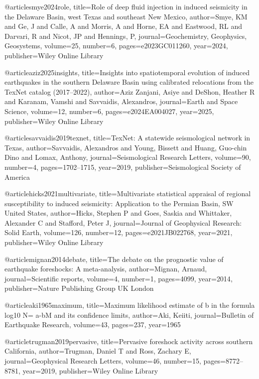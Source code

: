 @article{smye2024role,
  title={Role of deep fluid injection in induced seismicity in the Delaware Basin, west Texas and southeast New Mexico},
  author={Smye, KM and Ge, J and Calle, A and Morris, A and Horne, EA and Eastwood, RL and Darvari, R and Nicot, JP and Hennings, P},
  journal={Geochemistry, Geophysics, Geosystems},
  volume={25},
  number={6},
  pages={e2023GC011260},
  year={2024},
  publisher={Wiley Online Library}
}

@article{aziz2025insights,
  title={Insights into spatiotemporal evolution of induced earthquakes in the southern Delaware Basin using calibrated relocations from the TexNet catalog (2017--2022)},
  author={Aziz Zanjani, Asiye and DeShon, Heather R and Karanam, Vamshi and Savvaidis, Alexandros},
  journal={Earth and Space Science},
  volume={12},
  number={6},
  pages={e2024EA004027},
  year={2025},
  publisher={Wiley Online Library}
}

@article{savvaidis2019texnet,
  title={TexNet: A statewide seismological network in Texas},
  author={Savvaidis, Alexandros and Young, Bissett and Huang, Guo-chin Dino and Lomax, Anthony},
  journal={Seismological Research Letters},
  volume={90},
  number={4},
  pages={1702--1715},
  year={2019},
  publisher={Seismological Society of America}
}

@article{hicks2021multivariate,
  title={Multivariate statistical appraisal of regional susceptibility to induced seismicity: Application to the Permian Basin, SW United States},
  author={Hicks, Stephen P and Goes, Saskia and Whittaker, Alexander C and Stafford, Peter J},
  journal={Journal of Geophysical Research: Solid Earth},
  volume={126},
  number={12},
  pages={e2021JB022768},
  year={2021},
  publisher={Wiley Online Library}
}

@article{mignan2014debate,
  title={The debate on the prognostic value of earthquake foreshocks: A meta-analysis},
  author={Mignan, Arnaud},
  journal={Scientific reports},
  volume={4},
  number={1},
  pages={4099},
  year={2014},
  publisher={Nature Publishing Group UK London}
}

@article{aki1965maximum,
  title={Maximum likelihood estimate of b in the formula log10 N= a-bM and its confidence limits},
  author={Aki, Keiiti},
  journal={Bulletin of Earthquake Research},
  volume={43},
  pages={237},
  year={1965}
}

@article{trugman2019pervasive,
  title={Pervasive foreshock activity across southern California},
  author={Trugman, Daniel T and Ross, Zachary E},
  journal={Geophysical Research Letters},
  volume={46},
  number={15},
  pages={8772--8781},
  year={2019},
  publisher={Wiley Online Library}
}

